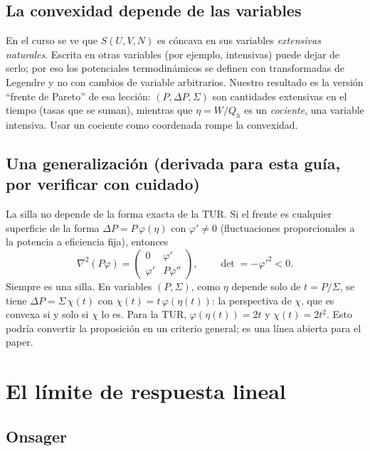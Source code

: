 \subsection{La convexidad depende de las variables}

En el curso se ve que $S(U,V,N)$ es cóncava en sus variables \emph{extensivas naturales}. Escrita
en otras variables (por ejemplo, intensivas) puede dejar de serlo; por eso los potenciales
termodinámicos se definen con transformadas de Legendre y no con cambios de variable arbitrarios.
Nuestro resultado es la versión ``frente de Pareto'' de esa lección: $(P,\Delta P,\Sigma)$ son
cantidades extensivas en el tiempo (tasas que se suman), mientras que $\eta = W/Q_h$ es un
\emph{cociente}, una variable intensiva. Usar un cociente como coordenada rompe la convexidad.

\subsection{Una generalización (derivada para esta guía, por verificar con cuidado)}

La silla no depende de la forma exacta de la TUR. Si el frente es cualquier superficie de la forma
$\Delta P = P\,\varphi(\eta)$ con $\varphi'\neq0$ (fluctuaciones proporcionales a la potencia a
eficiencia fija), entonces
\begin{equation}
\nabla^2(P\varphi) = \begin{pmatrix}0 & \varphi'\\ \varphi' & P\varphi''\end{pmatrix},\qquad
\det = -\varphi'^2 < 0 .
\end{equation}
Siempre es una silla. En variables $(P,\Sigma)$, como $\eta$ depende solo de $t = P/\Sigma$, se tiene
$\Delta P = \Sigma\,\chi(t)$ con $\chi(t) = t\,\varphi(\eta(t))$: la perspectiva de $\chi$, que es
convexa si y solo si $\chi$ lo es. Para la TUR, $\varphi(\eta(t)) = 2t$ y $\chi(t) = 2t^2$. Esto
podría convertir la proposición en un criterio general; es una línea abierta para el paper.

\section{El límite de respuesta lineal}
\label{sec:lr}

\subsection{Onsager}


